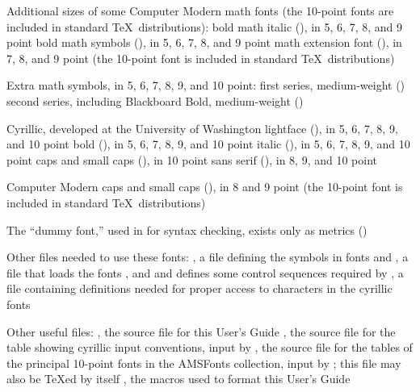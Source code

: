 \item{\bull} Additional sizes of some Computer Modern math fonts
  (the 10-point fonts are included in standard \TeX\ distributions):
\itemitem{--} bold math italic (), in 5, 6, 7, 8, and 9 point
\itemitem{--} bold math symbols (), in 5, 6, 7, 8, and 9 point
\itemitem{--} math extension font (), in 7, 8, and 9 point
              (the 10-point font is included in standard \TeX\ distributions)

\item{\bull} Extra math symbols, in 5, 6, 7, 8, 9, and 10 point:
\itemitem{--} first series, medium-weight ()
\itemitem{--} second series, including Blackboard Bold, medium-weight
  ()

\item{\bull} Cyrillic, developed at the University of Washington
\itemitem{--} lightface (), in 5, 6, 7, 8, 9, and 10 point
\itemitem{--} bold (), in 5, 6, 7, 8, 9, and 10 point
\itemitem{--} italic (), in 5, 6, 7, 8, 9, and 10 point
\itemitem{--} caps and small caps (), in 10 point
\itemitem{--} sans serif (), in 8, 9, and 10 point

\item{\bull} Computer Modern caps and small caps (),
  in 8 and 9 point
 (the 10-point font is included in standard \TeX\ distributions)

\item{\bull} The ``dummy font,'' used in \AmSTeX{} for syntax checking,
  exists only as metrics ()

\item{\bull} Other files needed to use these fonts:
\itemitem{--} , a file defining the symbols in fonts
   and 
\itemitem{--} , a file that loads the fonts
  ,  and  and defines some
  control sequences required by 
\itemitem{--} , a file containing definitions needed for
  proper access to characters in the cyrillic fonts

\item{\bull} Other useful files:
\itemitem{--} , the source file for this User's Guide
\itemitem{--} , the source file for the table showing
  cyrillic input conventions, input by 
\itemitem{--} , the source file for the tables of
  the principal 10-point fonts in the AMSFonts collection, input by
  ; this file may also be \TeX{}ed by itself
\itemitem{--} , the macros used to format this
  User's Guide
\endgraf
\endgroup       %

